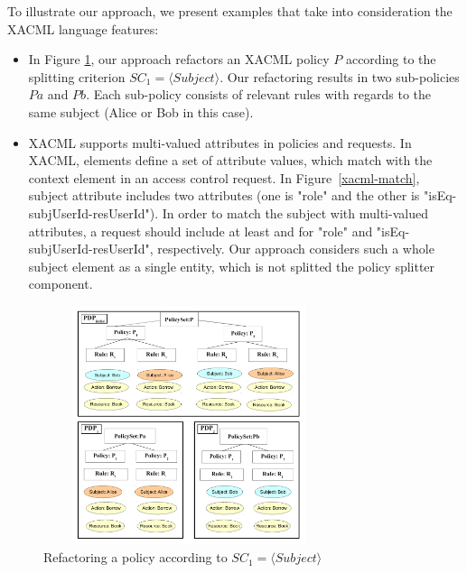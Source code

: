 To illustrate our approach, we present examples that take into consideration the XACML language features:
\begin{itemize}
\item In Figure \ref{splitting}, our approach refactors an XACML policy $P$  according to the splitting criterion $SC_{1}=\langle Subject\rangle$. Our refactoring results in two sub-policies $Pa$ and $Pb$. Each sub-policy consists of relevant rules with regards to the same subject (Alice or Bob in this case). 

\item
XACML supports multi-valued attributes in policies and requests. In XACML,  elements define a set of attribute values, which match with the context element in 
an access control request. In Figure~\ref{xacml-match}, subject attribute includes two attributes (one is "role" and the other is "isEq-subjUserId-resUserId"). In order to match the subject with multi-valued attributes, a request should include at least  and  for "role" and "isEq-subjUserId-resUserId", respectively.
Our approach considers such a whole subject element as a single entity, which is not splitted the policy splitter component.




\end{itemize}
\begin{figure}[!h]
\begin{center}
\includegraphics[width=8.5cm, height=7cm]{splitting}
\caption{Refactoring a policy according to $SC_{1}=\langle Subject\rangle$}
\label{splitting}
\end{center}
\end{figure} 


